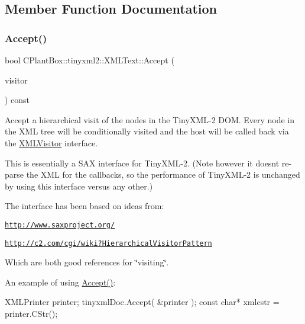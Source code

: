 \subsection{Member Function Documentation}
\mbox{\label{classCPlantBox_1_1tinyxml2_1_1XMLText_a4cb4d0408713d6372e5894fda37cb911}} 
\subsubsection{\texorpdfstring{Accept()}{Accept()}}
{\footnotesize\ttfamily bool C\+Plant\+Box\+::tinyxml2\+::\+X\+M\+L\+Text\+::\+Accept (\begin{DoxyParamCaption}\item[{\hyperlink{classCPlantBox_1_1tinyxml2_1_1XMLVisitor}{X\+M\+L\+Visitor} $\ast$}]{visitor }\end{DoxyParamCaption}) const\hspace{0.3cm}{\ttfamily [virtual]}}

Accept a hierarchical visit of the nodes in the Tiny\+X\+M\+L-\/2 D\+OM. Every node in the X\+ML tree will be conditionally visited and the host will be called back via the \hyperlink{classCPlantBox_1_1tinyxml2_1_1XMLVisitor}{X\+M\+L\+Visitor} interface.

This is essentially a S\+AX interface for Tiny\+X\+M\+L-\/2. (Note however it doesn\textquotesingle{}t re-\/parse the X\+ML for the callbacks, so the performance of Tiny\+X\+M\+L-\/2 is unchanged by using this interface versus any other.)

The interface has been based on ideas from\+:


\begin{DoxyItemize}
\item \href{http://www.saxproject.org/}{\tt http\+://www.\+saxproject.\+org/}
\item \href{http://c2.com/cgi/wiki?HierarchicalVisitorPattern}{\tt http\+://c2.\+com/cgi/wiki?\+Hierarchical\+Visitor\+Pattern}
\end{DoxyItemize}

Which are both good references for \char`\"{}visiting\char`\"{}.

An example of using \hyperlink{classCPlantBox_1_1tinyxml2_1_1XMLText_a4cb4d0408713d6372e5894fda37cb911}{Accept()}\+: \begin{DoxyVerb}XMLPrinter printer;
tinyxmlDoc.Accept( &printer );
const char* xmlcstr = printer.CStr();
\end{DoxyVerb}
 

